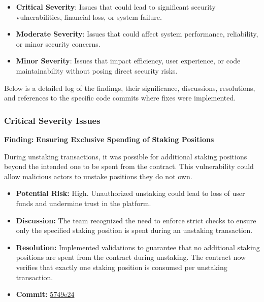 \documentclass{article}
\begin{document}
\begin{itemize}
    \item \textbf{Critical Severity}: Issues that could lead to significant security vulnerabilities, financial loss, or system failure.
    \item \textbf{Moderate Severity}: Issues that could affect system performance, reliability, or minor security concerns.
    \item \textbf{Minor Severity}: Issues that impact efficiency, user experience, or code maintainability without posing direct security risks.
\end{itemize}

Below is a detailed log of the findings, their significance, discussions, resolutions, and references to the specific code commits where fixes were implemented.

\subsubsection{Critical Severity Issues}

\begin{criticalbox}
\textbf{Finding:} \textbf{Ensuring Exclusive Spending of Staking Positions}

During unstaking transactions, it was possible for additional staking positions beyond the intended one to be spent from the contract. This vulnerability could allow malicious actors to unstake positions they do not own.

\begin{itemize}[label=$\diamond$]
    \item \textbf{Potential Risk:} High. Unauthorized unstaking could lead to loss of user funds and undermine trust in the platform.
    \item \textbf{Discussion:} The team recognized the need to enforce strict checks to ensure only the specified staking position is spent during an unstaking transaction.
    \item \textbf{Resolution:} Implemented validations to guarantee that no additional staking positions are spent from the contract during unstaking. The contract now verifies that exactly one staking position is consumed per unstaking transaction.
    \item \textbf{Commit:} \href{https://github.com/MuesliSwapLabs/muesliswap-onchain-staking/commit/5749e2475af1ebd35647f0b6f823853dda67b226}{5749e24}
\end{itemize}
\end{criticalbox}
\end{document}
